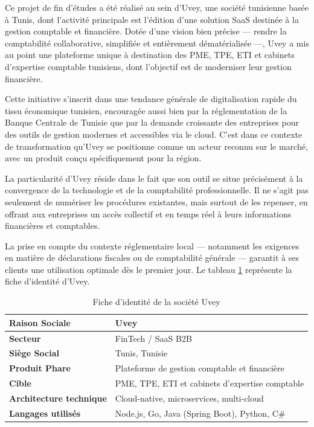 Ce projet de fin d'études a été réalisé au sein d'Uvey, une société tunisienne basée à Tunis, dont l'activité principale est l'édition d'une solution \ac{SaaS} destinée à la gestion comptable et financière. Dotée d'une vision bien précise --- rendre la comptabilité collaborative, simplifiée et entièrement dématérialisée ---, Uvey a mis au point une plateforme unique à destination des \ac{PME}, \ac{TPE}, \ac{ETI} et cabinets d'expertise comptable tunisiens, dont l'objectif est de moderniser leur gestion financière.

Cette initiative s'inscrit dans une tendance générale de digitalisation rapide du tissu économique tunisien, encouragée aussi bien par la réglementation de la Banque Centrale de Tunisie que par la demande croissante des entreprises pour des outils de gestion modernes et accessibles via le cloud. C'est dans ce contexte de transformation qu'Uvey se positionne comme un acteur reconnu sur le marché, avec un produit conçu spécifiquement pour la région.

La particularité d'Uvey réside dans le fait que son outil se situe précisément à la convergence de la technologie et de la comptabilité professionnelle. Il ne s'agit pas seulement de numériser les procédures existantes, mais surtout de les repenser, en offrant aux entreprises un accès collectif et en temps réel à leurs informations financières et comptables.

La prise en compte du contexte réglementaire local --- notamment les exigences en matière de déclarations fiscales ou de comptabilité générale --- garantit à ses clients une utilisation optimale dès le premier jour.
Le tableau \ref{tab:fiche_uvey} représente la fiche d'identité d'Uvey.

\begin{table}[htbp]
  \centering
  \renewcommand{\arraystretch}{1.3}
  \begin{tabularx}{\textwidth}{p{4cm} X}
    \toprule
    \rowcolor{uveylight}
    \textbf{Raison Sociale} & Uvey \\
    \midrule
    \textbf{Secteur} & \acf{FinTech} / \ac{SaaS} B2B \\
    \midrule
    \textbf{Siège Social} & Tunis, Tunisie \\
    \midrule
    \textbf{Produit Phare} & Plateforme de gestion comptable et financière \\
    \midrule
    \textbf{Cible} & \ac{PME}, \ac{TPE}, \ac{ETI} et cabinets d'expertise comptable \\
    \midrule
    \textbf{Architecture technique} & Cloud-native, microservices, multi-cloud \\
    \midrule
    \textbf{Langages utilisés} & Node.js, Go, Java (Spring Boot), Python, C\# \\
    \bottomrule
  \end{tabularx}
  \caption{Fiche d'identité de la société Uvey}
  \label{tab:fiche_uvey}
\end{table}

